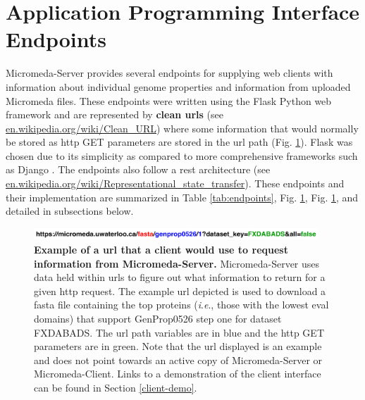 \section{Application Programming Interface Endpoints} \label{endpoints}

Micromeda-Server provides several endpoints for supplying web clients with 
information about individual genome properties and information from uploaded 
Micromeda files. These endpoints were written using the Flask Python web 
framework \cite{grinberg2018flask} and are represented by \textbf{clean 
\gls{url}s} (see 
\href{http://en.wikipedia.org/wiki/Clean_URL}{en.wikipedia.org/wiki/Clean\_URL}) 
where some information that would normally be stored as \gls{http} GET 
parameters are stored in the \gls{url} path (Fig. \ref{fig:endpoint-url}). Flask 
was chosen due to its simplicity as compared to more comprehensive frameworks 
such as Django \cite{holovaty2009definitive}. The endpoints also follow a 
\gls{rest} architecture \cite{fielding2000representational} (see 
\href{http://en.wikipedia.org/wiki/Representational_state_transfer}{en.wikipedia.org/wiki/Representational\_state\_transfer}). 
These endpoints and their implementation are summarized in Table 
\ref{tab:endpoints}, Fig. \ref{endpoints}, Fig. \ref{fig:endpoint-url}, and 
detailed in subsections below.

\begin{figure}[!ht]
  \centering
	\includegraphics[width=0.95\textwidth]{media/Coloured-Endpoint.pdf}
     \caption[Example of a URL that a client would use to request information 
from Micromeda-Server.]{\textbf{Example of a \gls{url} that a client would use 
to request information from Micromeda-Server.} Micromeda-Server uses data held 
within \gls{url}s to figure out what information to return for a given 
\gls{http} request. The example \gls{url} depicted is used to download a 
\gls{fasta} file containing the top proteins (\textit{i}.\textit{e}., those with 
the lowest \gls{eval}  domains) that support GenProp0526 step one for dataset 
FXDABADS. The \gls{url} path variables are in blue and the \gls{http} GET 
parameters are in green. Note that the \gls{url} displayed is an example and does 
not point towards an active copy of Micromeda-Server or Micromeda-Client. Links 
to a demonstration of the client interface can be found in Section 
\ref{client-demo}.}
	 \label{fig:endpoint-url}
\end{figure}

